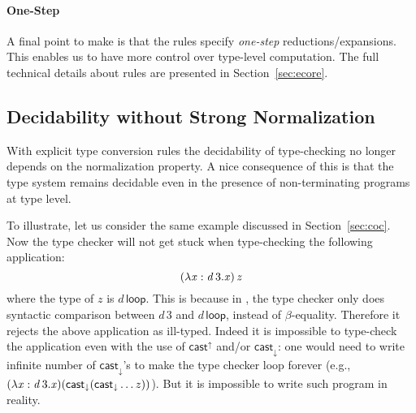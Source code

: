 \paragraph{One-Step}
A final point to make is that the \cast rules specify \emph{one-step}
reductions/expansions. 
This enables us to have more control over type-level
computation. The full technical details about \cast rules are presented
in Section~\ref{sec:ecore}.

\subsection{Decidability without Strong Normalization}

With explicit type conversion rules the decidability of type-checking 
no longer depends on the normalization property. 
A nice consequence of this is that the type system remains decidable
even in the presence of non-terminating programs at type level.

To illustrate, let us consider the same example discussed in
Section~\ref{sec:coc}. Now the type checker will not get stuck when
type-checking the following application:
\[ (  \lambda  \mathit{x}  :  \mathit{d} \, 3  .  \mathit{x}  ) \, \mathit{z} \]
where the type of $z$ is $d\,\mathsf{loop}$.  This is because in
\name, the type checker only does syntactic comparison between $d\,3$
and $d\,\mathsf{loop}$, instead of $\beta$-equality. Therefore it
rejects the above application as ill-typed. Indeed it is impossible to
type-check the application even with the use of $ \mathsf{cast}^{\uparrow} $ and/or
$ \mathsf{cast}_{\downarrow} $: one would need to write infinite number of
$ \mathsf{cast}_{\downarrow} $'s to make the type checker loop forever (e.g.,
$(\lambda  \mathit{x}  :  \mathit{d} \, 3  .  \mathit{x})( \mathsf{cast}_{\downarrow} ( \mathsf{cast}_{\downarrow}  \dots z))$). But it is
impossible to write such program in reality.

